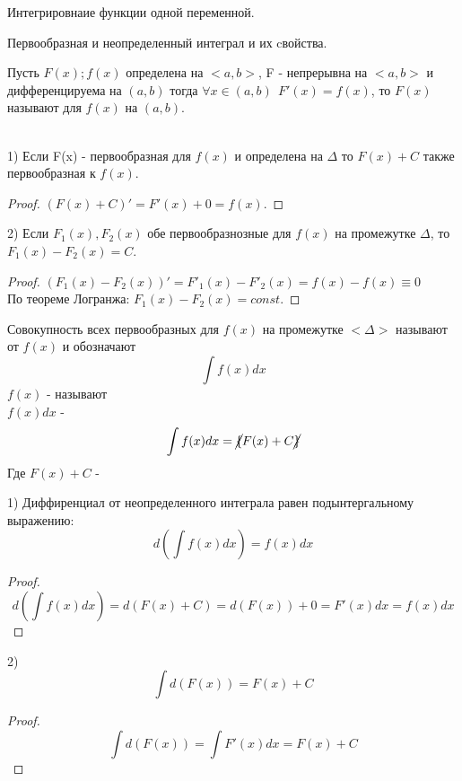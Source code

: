 \begin{title}
  Интегрировнаие функции одной переменной.
\end{title}

\begin{title}[\Large]
  Первообразная и неопределенный интеграл и их cвойства.
\end{title}

\begin{defin}[первообразной]
  Пусть $F(x); f(x)$ определена на $<a,b>$, F - непрерывна на $<a,b>$ и
  дифференцируема на $(a,b)$ тогда $\forall x \in (a, b) ~~ F'(x) = f(x)$,
  то $F(x)$ называют  для $f(x)$ на $(a,b)$.
\end{defin}

\\
1) Если F(x) - первообразная для $f(x)$ и определена на $\Delta$ то $F(x) + C$
также первообразная к $f(x)$.\\
\begin{proof}
  $(F(x) + C)' = F'(x) + 0 = f(x)$.
\end{proof}

2) Если $F_{1}(x), F_{2}(x)$ обе первообразнозные для $f(x)$ на промежутке
$\Delta$, то $F_{1}(x) - F_{2}(x) = C$.\\
\begin{proof}
  $(F_{1}(x) - F_{2}(x))' = F'_{1}(x) - F'_{2}(x) = f(x) - f(x) \equiv 0$\\
  По теореме Логранжа: $F_{1}(x) - F_{2}(x) = const$.
\end{proof}

\begin{defin}
  Совокупность всех первообразных для $f(x)$ на промежутке $<\Delta>$ называют
   от $f(x)$ и обозначают
  \[\int f(x)dx\]
  $f(x)$ - называют \\
  $f(x)dx$ - 
  \[\int f(x)dx = \cancel{\{} F(x) + C \cancel{\}}\]
  Где $F(x) + C$ - 
\end{defin}

1) Диффиренциал от неопределенного интеграла равен подынтергальному выражению:
\[d \left ( \int f(x)dx \right ) = f(x)dx \]
\begin{proof}
  \[d \left ( \int f(x)dx \right ) = d(F(x) + C) = d(F(x)) + 0 = F'(x)dx
  = f(x)dx\]
\end{proof}

2) \[\int d(F(x)) = F(x) + C\]
\begin{proof}
  \[\int d(F(x)) = \int F'(x)dx = F(x) + C\]
\end{proof}

